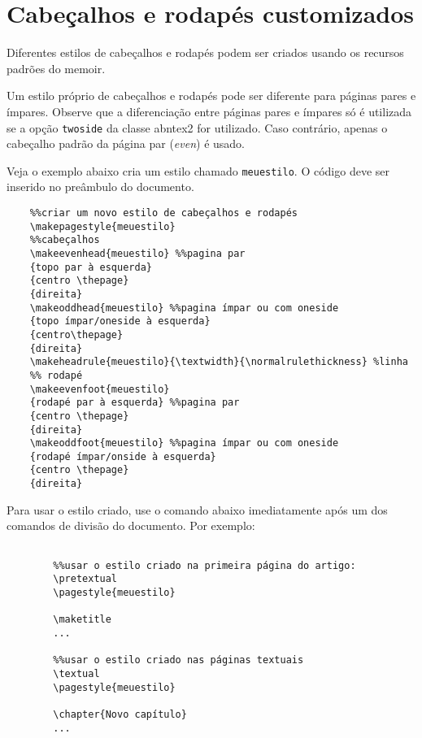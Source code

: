 \section{Cabeçalhos e rodapés customizados}

Diferentes estilos de cabeçalhos e rodapés podem ser criados usando os
recursos padrões do \textsf{memoir}.

Um estilo próprio de cabeçalhos e rodapés pode ser diferente para páginas pares
e ímpares. Observe que a diferenciação entre páginas pares e ímpares só é
utilizada se a opção \texttt{twoside} da classe \textsf{abntex2} for utilizado.
Caso contrário, apenas o cabeçalho padrão da página par (\emph{even}) é usado.

Veja o exemplo abaixo cria um estilo chamado \texttt{meuestilo}. O código deve
ser inserido no preâmbulo do documento.

\begin{verbatim}
	%%criar um novo estilo de cabeçalhos e rodapés
	\makepagestyle{meuestilo}
	%%cabeçalhos
	\makeevenhead{meuestilo} %%pagina par
	{topo par à esquerda}
	{centro \thepage}
	{direita}
	\makeoddhead{meuestilo} %%pagina ímpar ou com oneside
	{topo ímpar/oneside à esquerda}
	{centro\thepage}
	{direita}
	\makeheadrule{meuestilo}{\textwidth}{\normalrulethickness} %linha
	%% rodapé
	\makeevenfoot{meuestilo}
	{rodapé par à esquerda} %%pagina par
	{centro \thepage}
	{direita} 
	\makeoddfoot{meuestilo} %%pagina ímpar ou com oneside
	{rodapé ímpar/onside à esquerda}
	{centro \thepage}
	{direita}
\end{verbatim}

Para usar o estilo criado, use o comando abaixo imediatamente após um dos
comandos de divisão do documento. Por exemplo:

\begin{verbatim}
	
		%%usar o estilo criado na primeira página do artigo:
		\pretextual
		\pagestyle{meuestilo}
		
		\maketitle
		...
		
		%%usar o estilo criado nas páginas textuais
		\textual
		\pagestyle{meuestilo}
		
		\chapter{Novo capítulo}
		...
	  
\end{verbatim}

